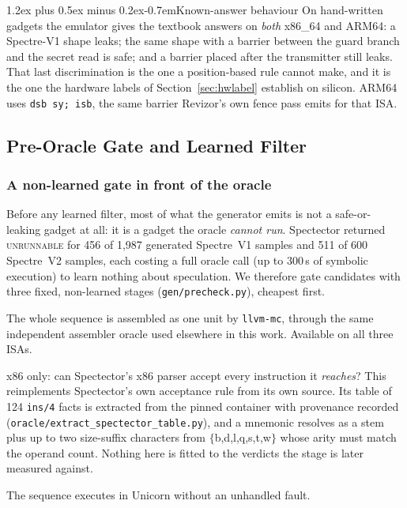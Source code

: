 \documentclass[conference]{IEEEtran}
\makeatletter
\renewcommand\paragraph{\@startsection{paragraph}{4}{\z@}%
  {1.2ex plus 0.5ex minus 0.2ex}{-0.7em}{\normalfont\normalsize\bfseries}}
\makeatother
\begin{document}
\paragraph{Known-answer behaviour}
On hand-written gadgets the emulator gives the textbook answers on
\emph{both} x86\_64 and ARM64: a Spectre-V1 shape leaks; the same shape with a
barrier between the guard branch and the secret read is safe; and a barrier
placed after the transmitter still leaks. That last discrimination is the one a
position-based rule cannot make, and it is the one the hardware labels of
Section~\ref{sec:hwlabel} establish on silicon. ARM64 uses
\texttt{dsb sy; isb}, the same barrier Revizor's own fence pass emits for that
ISA.


\subsection{Pre-Oracle Gate and Learned Filter}
\label{sec:filterdesign}

\subsubsection{A non-learned gate in front of the oracle}
\label{sec:precheck}

Before any learned filter, most of what the generator emits is not a
safe-or-leaking gadget at all: it is a gadget the oracle \emph{cannot run}.
Spectector returned \textsc{unrunnable} for 456 of 1,987 generated Spectre~V1
samples and 511 of 600 Spectre~V2 samples, each costing a full oracle call (up
to 300\,s of symbolic execution) to learn nothing about speculation. We
therefore gate candidates with three fixed, non-learned stages
(\texttt{gen/precheck.py}), cheapest first.

\begin{description}[itemsep=1pt,leftmargin=0.9em]
  \item[A. Assembles.] The whole sequence is assembled as one unit by
    \texttt{llvm-mc}, through the same independent assembler oracle used
    elsewhere in this work. Available on all three ISAs.
  \item[B. Oracle front end.] x86 only: can Spectector's x86 parser accept
    every instruction it \emph{reaches}? This reimplements Spectector's own
    acceptance rule from its own source. Its table of 124 \texttt{ins/4} facts
    is extracted from the pinned container with provenance recorded
    (\texttt{oracle/extract\_spectector\_table.py}), and a mnemonic resolves as
    a stem plus up to two size-suffix characters from
    $\{$b,d,l,q,s,t,w$\}$ whose arity must match the operand count. Nothing
    here is fitted to the verdicts the stage is later measured against.
  \item[C. Emulates.] The sequence executes in Unicorn without an unhandled
    fault.
\end{description}
\end{document}
